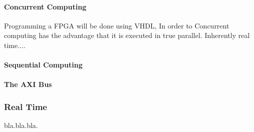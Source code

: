 
\paragraph{Concurrent Computing} %
\label{par:concurrent_computing}
Programming a FPGA will be done using VHDL,
In order to   
Concurrent computing has the advantage that it is executed in true parallel.
Inherently real time....

\paragraph{Sequential Computing} %
\label{par:sequential_computing}

\paragraph{The AXI Bus} %
\label{par:the_axi_bus}


\subsubsection{Real Time} %
\label{ssub:real_time}
bla.bla.bla.



